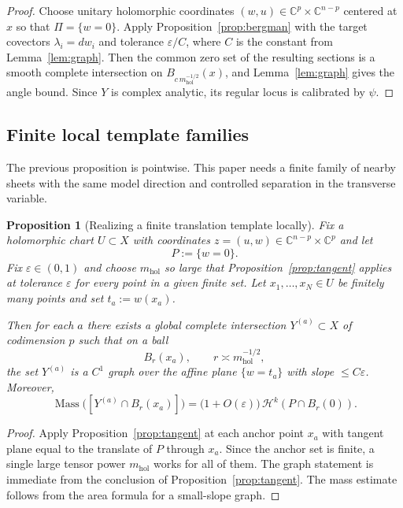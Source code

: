 \documentclass[11pt]{article}
\numberwithin{equation}{section}
\theoremstyle{plain}
\newtheorem{proposition}[theorem]{Proposition}
\theoremstyle{definition}
\theoremstyle{remark}
\DeclareMathOperator{\Mass}{Mass}
\newcommand{\C}{\mathbb{C}}
\newcommand{\eps}{\varepsilon}
\newcommand{\mhol}{m_{\mathrm{hol}}}
\newcommand{\calH}{\mathcal{H}}
\begin{document}
\begin{proof}
Choose unitary holomorphic coordinates $(w,u)\in \C^p\times\C^{n-p}$ centered at $x$ so that $\Pi=\{w=0\}$.  Apply Proposition~\ref{prop:bergman} with the target covectors $\lambda_i = dw_i$ and tolerance $\eps/C$, where $C$ is the constant from Lemma~\ref{lem:graph}.  Then the common zero set of the resulting sections is a smooth complete intersection on $B_{c\,\mhol^{-1/2}}(x)$, and Lemma~\ref{lem:graph} gives the angle bound.  Since $Y$ is complex analytic, its regular locus is calibrated by $\psi$.
\end{proof}

\subsection{Finite local template families}

The previous proposition is pointwise.  This paper needs a finite family of nearby sheets with the same model direction and controlled separation in the transverse variable.

\begin{proposition}[Realizing a finite translation template locally]\label{prop:finite-template}
Fix a holomorphic chart $U \subset X$ with coordinates $z=(u,w)\in \C^{n-p}\times\C^p$ and let
\[
P := \{w=0\}.
\]
Fix $\eps \in (0,1)$ and choose $\mhol$ so large that Proposition~\ref{prop:tangent} applies at tolerance $\eps$ for every point in a given finite set.  Let $x_1,\dots,x_N \in U$ be finitely many points and set $t_a := w(x_a)$.

Then for each $a$ there exists a global complete intersection $Y^{(a)} \subset X$ of codimension $p$ such that on a ball
\[
B_{r}(x_a),
\qquad
r \asymp \mhol^{-1/2},
\]
the set $Y^{(a)}$ is a $C^1$ graph over the affine plane $\{w=t_a\}$ with slope $\le C\eps$.  Moreover,
\[
\Mass\bigl([Y^{(a)}\cap B_r(x_a)]\bigr)
=
\bigl(1+O(\eps)\bigr)\,\calH^{k}(P\cap B_r(0)).
\]
\end{proposition}

\begin{proof}
Apply Proposition~\ref{prop:tangent} at each anchor point $x_a$ with tangent plane equal to the translate of $P$ through $x_a$.  Since the anchor set is finite, a single large tensor power $\mhol$ works for all of them.  The graph statement is immediate from the conclusion of Proposition~\ref{prop:tangent}.  The mass estimate follows from the area formula for a small-slope graph.
\end{proof}
\end{document}
